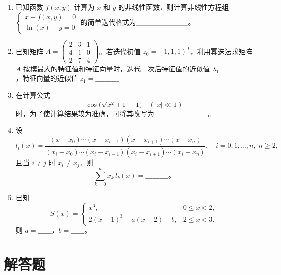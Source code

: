 \documentclass[12pt,a4paper]{article}
\begin{document}
\begin{enumerate}
        \item 已知函数 $f(x,y)$ 计算为 $x$ 和 $y$ 的非线性函数，则计算非线性方程组 $\begin{cases} x + f(x,y) = 0 \\ \ln(x) - y = 0 \end{cases}$ 的简单迭代格式为\_\_\_\_\_\_\_\_\_\_。
        
        \item 已知矩阵 $A = \begin{pmatrix} 2 & 3 & 1 \\ 4 & 1 & 0 \\ 2 & 7 & 4 \end{pmatrix}$。若迭代初值 $z_0 = (1,1,1)^T$，利用幂迭法求矩阵 $A$ 按模最大的特征值和特征向量时，迭代一次后特征值的近似值 $\lambda_1 = \_\_\_\_\_\_\_\_\_\_$，特征向量的近似值 $z_1 = \_\_\_\_\_\_\_\_\_\_$
        
         \item 在计算公式
        \[
          \cos\!\bigl(\sqrt{x^2+1}-1\bigr)\quad (|x|\ll1)
        \]
        时，为了使计算结果较为准确，可将其改写为 \_\_\_\_\_\_\_\_\_\_。
        
        \item 设
        \[
          l_i(x)
          =\frac{(x-x_0)\cdots(x-x_{i-1})(x-x_{i+1})\cdots(x-x_n)}
                 {(x_i-x_0)\cdots(x_i-x_{i-1})(x_i-x_{i+1})\cdots(x_i-x_n)},
          \quad i=0,1,\dots,n,\;n\ge2,
        \]
        且当 $i\neq j$ 时 $x_i\neq x_j$。则
        \[
          \sum_{k=0}^n x_k\,l_k(x)
          =\_\_\_\_\_\_\_\_\_\_。
        \]
        
        \item 已知
        \[
          S(x)=
          \begin{cases}
            x^3, & 0\le x<2,\\
            2(x-1)^3 + a(x-2) + b, & 2\le x<3.
          \end{cases}
        \]
        则 $a=\_\_\_\_\_\_$，\quad $b=\_\_\_\_\_\_$。
        
    \end{enumerate}
    
    \section{解答题}
    
\end{document}
